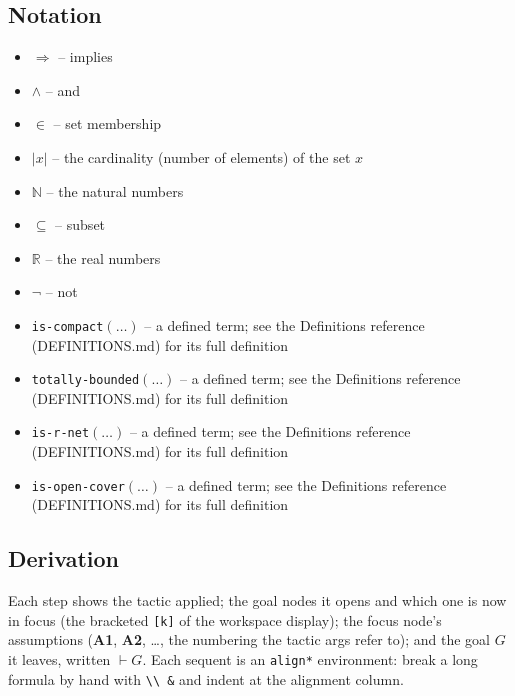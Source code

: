 \documentclass[11pt]{article}
\begin{document}
\subsection*{Notation}
\begin{itemize}
\item $\Rightarrow$ -- implies
\item $\wedge$ -- and
\item $\in$ -- set membership
\item $|x|$ -- the cardinality (number of elements) of the set $x$
\item $\mathbb{N}$ -- the natural numbers
\item $\subseteq$ -- subset
\item $\mathbb{R}$ -- the real numbers
\item $\neg$ -- not
\item \texttt{is-compact}$(\ldots)$ -- a defined term; see the Definitions reference (DEFINITIONS.md) for its full definition
\item \texttt{totally-bounded}$(\ldots)$ -- a defined term; see the Definitions reference (DEFINITIONS.md) for its full definition
\item \texttt{is-r-net}$(\ldots)$ -- a defined term; see the Definitions reference (DEFINITIONS.md) for its full definition
\item \texttt{is-open-cover}$(\ldots)$ -- a defined term; see the Definitions reference (DEFINITIONS.md) for its full definition
\end{itemize}

\subsection*{Derivation}
Each step shows the tactic applied; the goal nodes it opens and which one is now in focus (the bracketed \texttt{[k]} of the workspace display); the focus node's assumptions (\textbf{A1}, \textbf{A2}, \dots{}, the numbering the tactic args refer to); and the goal $G$ it leaves, written $\vdash G$.  Each sequent is an \texttt{align*} environment: break a long formula by hand with \texttt{\textbackslash\textbackslash\ \&} and indent at the alignment column.
\end{document}
